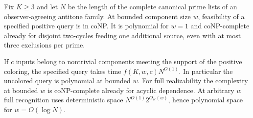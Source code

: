 \begin{theorem}
\label{core:thm:prime-component-space}
Fix $K\ge3$ and let $N$ be the length of the complete canonical
prime lists of an observer-agreeing antitone family. At bounded
component size $w$, feasibility of a specified positive query is in
coNP. It is polynomial for $w=1$ and coNP-complete already for
disjoint two-cycles feeding one additional source, even with at
most three exclusions per prime.

If $c$ inputs belong to nontrivial components meeting the support of
the positive coloring, the specified query takes time $f(K,w,c)N^{O(1)}$.
In particular the uncolored query is polynomial at bounded $w$.
For full realizability the complexity at bounded $w$ is coNP-complete
already for acyclic dependence. At arbitrary $w$ full recognition uses
deterministic space $N^{O(1)}2^{O_K(w)}$, hence polynomial space for
$w=O(\log N)$.
\end{theorem}
